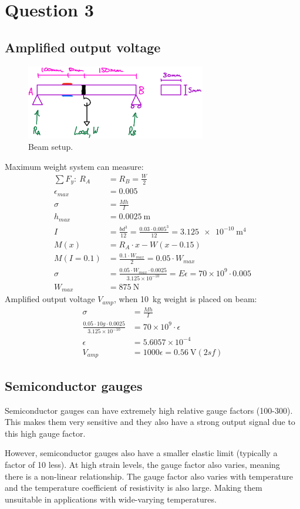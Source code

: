 \documentclass[12pt]{article}
\numberwithin{equation}{section}
\begin{document}
\section{Question 3}
\subsection*{Amplified output voltage}
\begin{figure}[H]
  \centering
  \includegraphics[width=0.7\textwidth]{./img/6-1diagram.png}
  \caption{Beam setup.}
\end{figure}
Maximum weight system can measure:
\begin{align}
  \sum F_y: \ R_A &= R_B = \frac{W}{2}\\
  \epsilon_{max} &= 0.005\\
  \sigma &= \frac{Mh}{I}\\
  h_{max} &= \SI{0.0025}{\metre}\\
  I &= \frac{bd^3}{12} = \frac{0.03 \cdot 0.005^3}{12} = \SI{3.125e-10}{\metre\tothe{4}}\\
  M(x) &= R_A \cdot x - W(x-0.15)\\
  M(I=0.1) &= \frac{0.1 \cdot W_{max}}{2} = 0.05\cdot W_{max}\\
  \sigma &= \frac{0.05\cdot W_{max} \cdot 0.0025}{3.125 \times 10^{-10}} = E\epsilon = 70 \times 10^{9} \cdot 0.005\\
  W_{max} &= \SI{875}{\newton}
\end{align}
Amplified output voltage $V_{amp}$, when \SI{10}{\kilo\gram} weight is placed on beam:
\begin{align}
  \sigma &= \frac{Mh}{I}\\
  \frac{0.05\cdot 10g \cdot 0.0025}{3.125\times 10^{-10}} &= 70 \times 10^{9} \cdot \epsilon\\
  \epsilon &= 5.6057 \times 10^{-4}\\
  V_{amp} &= 1000\epsilon = \SI{0.56}{\volt} (2sf)
\end{align}
\subsection*{Semiconductor gauges}
Semiconductor gauges can have extremely high relative gauge factors (100-300). This makes them very sensitive and they also have a strong output signal due to this high gauge factor.

However, semiconductor gauges also have a smaller elastic limit (typically a factor of 10 less). At high strain levels, the gauge factor also varies, meaning there is a non-linear relationship. The gauge factor also varies with temperature and the temperature coefficient of resistivity is also large. Making them unsuitable in applications with wide-varying temperatures.
\end{document}
